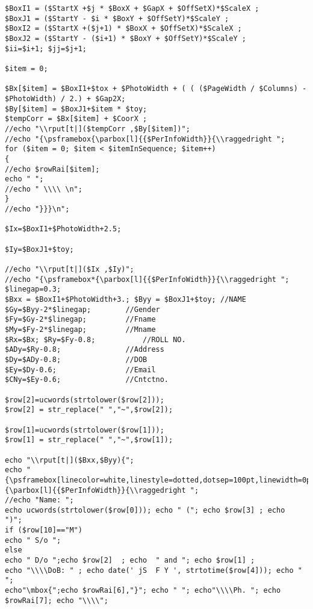 \begin{verbatim}
$BoxI1 = ($StartX +$j * $BoxX + $GapX + $OffSetX)*$ScaleX ;
$BoxJ1 = ($StartY - $i * $BoxY + $OffSetY)*$ScaleY ;
$BoxI2 = ($StartX +($j+1) * $BoxX + $OffSetX)*$ScaleX ;
$BoxJ2 = ($StartY - ($i+1) * $BoxY + $OffSetY)*$ScaleY ;
$ii=$i+1; $jj=$j+1; 

$item = 0;

$Bx[$item] = $BoxI1+$tox + $PhotoWidth + ( ( ($PageWidth / $Columns) - $PhotoWidth) / 2.) + $Gap2X;
$By[$item] = $BoxJ1+$item * $toy;
$tempCorr = $Bx[$item] + $CoorX ;
//echo "\\rput[t|]($tempCorr ,$By[$item])";
//echo "{\psframebox{\parbox[l]{{$PerInfoWidth}}{\\raggedright ";
for ($item = 0; $item < $itemInSequence; $item++)
{
//echo $rowRai[$item]; 
echo " ";
//echo " \\\\ \n";
}
//echo "}}}\n";

$Ix=$BoxI1+$PhotoWidth+2.5;

$Iy=$BoxJ1+$toy;

//echo "\\rput[t|]($Ix ,$Iy)";
//echo "{\psframebox*{\parbox[l]{{$PerInfoWidth}}{\\raggedright ";
$linegap=0.3;
$Bxx = $BoxI1+$PhotoWidth+3.; $Byy = $BoxJ1+$toy; //NAME
$Gy=$Byy-2*$linegap; 		//Gender
$Fy=$Gy-2*$linegap;  		//Fname       
$My=$Fy-2*$linegap;  		//Mname
$Rx=$Bx; $Ry=$Fy-0.8;           //ROLL NO.
$ADy=$Ry-0.8;  		        //Address
$Dy=$ADy-0.8;  		        //DOB
$Ey=$Dy-0.6;  		        //Email
$CNy=$Ey-0.6;   	        //Cntctno.

$row[2]=ucwords(strtolower($row[2]));
$row[2] = str_replace(" ","~",$row[2]);

$row[1]=ucwords(strtolower($row[1]));
$row[1] = str_replace(" ","~",$row[1]);

echo "\\rput[t|]($Bxx,$Byy){";
echo "{\psframebox[linecolor=white,linestyle=dotted,dotsep=100pt,linewidth=0pt]{\parbox[l]{{$PerInfoWidth}}{\\raggedright ";
//echo "Name: ";
echo ucwords(strtolower($row[0])); echo " ("; echo $row[3] ; echo  ")"; 
if ($row[10]=="M")
echo " S/o ";
else
echo " D/o ";echo $row[2]  ; echo  " and "; echo $row[1] ;
echo "\\\\DoB: " ; echo date(' jS  F Y ', strtotime($row[4])); echo " ";
echo"\mbox{";echo $rowRai[6],"}"; echo " "; echo"\\\\Ph. "; echo $rowRai[7]; echo "\\\\";


\end{verbatim}
